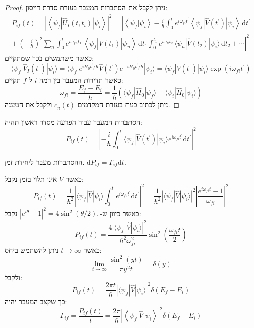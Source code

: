 \documentclass{tstextbook}
\begin{document}
\begin{proof}
ניתן לקבל את הסתברות המעבר בעזרת סדרת דייסון:
$$\begin{gather}P_{i f}(t)=\left|\left\langle \psi_{f}|\hat{U}_{I}(t,t_{i})|\psi_{i} \right\rangle\right|^{2}=\left|\left\langle \psi_{f}|\psi_{i} \right\rangle-\frac{i}{\hbar}\int_{0}^{t}e^{i\omega_{f i}t^{\prime}}\left\langle \psi_{f}|\hat{V}\left( t^{\prime} \right)|\psi_{i} \right\rangle\,\mathrm{d}t^{\prime}\right.\\ \left.+\,\left(-\frac{i}{\hbar}\right)^{2}\sum_{n}\int_{0}^{t}e^{i\omega_{f n}t_{1}}\,\left\langle \psi_{f}|\hat{V}(t_{1})|\psi_{n} \right\rangle\,\mathrm{d}t_{1}\!\!\int_{0}^{t_{1}}\!e^{i\omega_{n}t_{2}}\,\langle \psi_{n}|\hat{V}(t_{2})|\psi_{i} \rangle\,\mathrm{d}t_{2}+\cdots\right|^{2} 
\end{gather}$$
כאשר משתמשים בכך שמתקיים:
$$\langle\psi_{f}|\hat{V}_{I}(t^{\prime})|\psi_{i}\rangle=\langle\psi_{f}| e^{i H_{0}t^{\prime}/\hbar}\hat{V}(t^{\prime})e^{-i H_{0}t^{\prime}/\hbar}|\psi_{i}\rangle=\langle\psi_{f}| V(t^{\prime})|\psi_{i}\rangle\exp\left(i\omega_{f i}t^{\prime}\right)$$
כאשר תדירות המעבר בין רמה \(i\) ל-\(f\) תקיים:
$$\omega_{f i}=\frac{E_{f}-E_{i}}{h}=\frac{1}{h}\left(\langle\psi_{f}|\hat{H}_{0}|\psi_{f}\rangle-\langle\psi_{i}|\hat{H}_{0}|\psi_{i}\rangle\right)$$
ניתן לכתוב כעת בעזרת המקדמים \(c_{n}(t)\) ולקבל את הטענה.

\end{proof}
\begin{corollary}
הסתברות המעבר עבור הפרעה מסדר ראשון תהיה:
$$P_{i f}(t)=\left|-\frac{i}{\hbar}\int_{0}^{t}\langle\psi_{f}|\hat{V}(t^{\prime})|\psi_{i}\rangle e^{i\omega_{f i}t^{\prime}}\mathrm{d}t^{\prime}\right|^{2}$$

\end{corollary}
\begin{definition}
ההסתברות מעבר ליחידת זמן. \(\mathrm{d}P_{if}=\Gamma_{if}\mathrm{d}t\).

\end{definition}
\begin{example}
כאשר \(V\) אינו תלוי בזמן נקבל:
$$P_{i f}(t)=\frac{1}{\hbar^{2}}\left| \langle\psi_{f} | \hat{V} | \psi_{i}\rangle\int_{0}^{t}e^{i\omega_{f i}t^{\prime}}\mathrm{d}t^{\prime}\right|^{2}\!\!=\!\frac{1}{\hbar^{2}}\left| \langle\psi_{f} | \hat{V} | \psi_{i}\rangle\right|^{2}\left| \frac{e^{i\omega_{f i}t}-1}{\omega_{f i}}\right|^{2}$$
כאשר כיוון ש-\(|e^{i\theta}-1|^{2}=4\sin^{2}(\theta/2),\) נקבל:
$$P_{i f}(t)=\frac{4\left| \langle\psi_{f} | \hat{V} | \psi_{i}\rangle\right|^{2}}{\hbar^{2}\omega_{f i}^{2}}\sin^{2}\left(\frac{\omega_{f i}t}{2}\right)$$
כאשר \(t\to \infty\) ניתן להשתמש ביחס:
$$\operatorname*{lim}_{t\rightarrow\infty}\frac{\sin^{2}(y t)}{\pi y^{2}t}=\delta(y)$$
ולקבל:
$$P_{i f}(t)=\frac{2\pi t}{\hbar}\left| \langle\psi_{f} | \hat{V} | \psi_{i}\rangle\right|^{2}\delta(E_{f}-E_{i})$$
כך שקצב המעבר יהיה:
$$\Gamma_{i f}=\frac{P_{i f}(t)}{t}=\frac{2\pi}{\hbar}\left|\left<\psi_{f}|\hat{V}|\psi_{i}\right>\right|^{2}\delta(E_{f}-E_{i})$$

\end{example}
\end{document}
